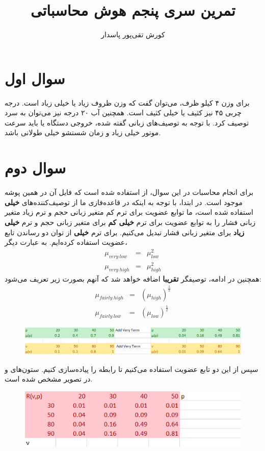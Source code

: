 \documentclass[12pt]{report}
\title{تمرین سری پنجم هوش محاسباتی}
\author{کورش تقی‌پور پاسدار}
\begin{document}
	\maketitle
	\tableofcontents
	\newpage
	\section{سوال اول}
	برای وزن ۴ کیلو ظرف، می‌توان گفت که وزن ظروف زیاد یا خیلی زیاد است. درجه چربی ۴۵ نیز کثیف یا خیلی کثیف است. همچنین آب ۲۰ درجه نیز می‌توان به سرد توصیف کرد. با توجه به توصیف‌های زبانی گفته شده، خروجی دستگاه یا باید سرعت موتور خیلی زیاد و زمان شستشو خیلی طولانی باشد.
	\section{سوال دوم}
	برای انجام محاسبات در این سوال، از  استفاده شده است که فایل آن در همین پوشه موجود است.
	\newline
	در ابتدا، با توجه به اینکه در قاعده‌فازی ما از توصیف‌کننده‌های \textbf{خیلی} استفاده شده است، ما توابع عضویت برای ترم کم متغیر زبانی حجم و ترم زیاد متغیر زبانی فشار را به توابع عضویت برای ترم \textbf{خیلی کم} برای متغیر زبانی حجم و ترم \textbf{خیلی زیاد} برای متغیر زبانی فشار تبدیل می‌کنیم. برای ترم \textbf{خیلی} از توان دو رساندن تابع عضویت استفاده کرده‌ایم. به عبارت دیگر،
	\begin{eqnarray*}
		\mu_{very\ low} &=& \mu_{low}^{2}\\
		\mu_{very\ high} &=& \mu_{high}^{2}
	\end{eqnarray*}
	همچنین در ادامه، توصیفگر \textbf{تقریبا} اضافه خواهد شد که آنهم بصورت زیر تعریف می‌شود:
	\begin{eqnarray*}
		\mu_{fairly\ high} &=& (\mu_{high})^{\frac{1}{2}}\\
		\mu_{fairly\ low} &=& (\mu_{low})^{\frac{1}{2}}
	\end{eqnarray*}
	\begin{figure}[H]
		\centering
		\includegraphics[scale=0.5]{pic_1}
	\end{figure}
	سپس از این دو تابع عضویت استفاده می‌کنیم تا رابطه  را پیاده‌سازی کنیم. ستون‌های  و  در تصویر مشخص شده است.
	\begin{figure}[H]
		\centering
		\includegraphics[scale=0.5]{pic_2}
	\end{figure}
\end{document}
